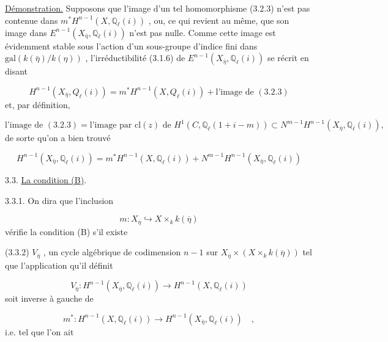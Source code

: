 \underline{Démonstration.} Supposons que l'image d'un tel homomorphisme (3.2.3) n'est pas contenue dans $m^{*}H^{n-1}(X,\mathbb{Q}_{\ell}(i))$ , ou, ce qui revient au même, que son image dans $E^{n-1}(X_{\bar{\eta}},\mathbb{Q}_{\ell}(i))$ n'est pas nulle. Comme cette image est évidemment stable sous l'action d'un sous-groupe d'indice fini dans $\mathrm{gal}(k(\bar{\eta})/k(\eta))$ , l'irréductibilité (3.1.6) de $E^{n-1}(X_{\bar{\eta}},\mathbb{Q}_{\ell}(i))$ se récrit en disant

\begin{equation*}
H^{n-1}(X_{\bar{\eta}},Q_{\ell}(i)) = m^{*}H^{n-1}(X,Q_{\ell}(i)) + \text{l'image de } (3.2.3)
\end{equation*}
et, par définition,

\begin{equation*}
\text{l'image de } (3.2.3) = \text{l'image par } \mathrm{cl}(z) \text{ de } H^{1}(C,\mathbb{Q}_{\ell}(1+i-m)) \subset N^{m-1}H^{n-1}(X_{\bar{\eta}},\mathbb{Q}_{\ell}(i)) ,
\end{equation*}
de sorte qu'on a bien trouvé

\begin{equation*}
H^{n-1}(X_{\bar{\eta}},\mathbb{Q}_{\ell}(i)) = m^{*}H^{n-1}(X,\mathbb{Q}_{\ell}(i)) + N^{m-1}H^{n-1}(X_{\bar{\eta}},\mathbb{Q}_{\ell}(i))
\end{equation*}



3.3. \underline{La condition (B)}.

3.3.1. On dira que l'inclusion

\begin{equation*}
m : X_{\overline{\eta}} \hookrightarrow X \times_{k} k(\overline{\eta})
\end{equation*}
vérifie la condition (B)  s'il existe

(3.3.2) $V_{\overline{\eta}}$ , un cycle algébrique de codimension $n-1$ sur $X_{\overline{\eta}} \times (X \times_{k} k(\overline{\eta}))$ tel que l'application qu'il définit

\begin{equation}\tag{3.3.3}
V_{\overline{\eta}} : H^{n-1}(X_{\overline{\eta}},\mathbb{Q}_{\ell}(i)) \longrightarrow H^{n-1}(X,\mathbb{Q}_{\ell}(i))
\end{equation}
soit inverse à gauche de

\begin{equation}\tag{3.3.4}
m^* : H^{n-1}(X,\mathbb{Q}_{\ell}(i)) \longrightarrow H^{n-1}(X_{\overline{\eta}},\mathbb{Q}_{\ell}(i)) \quad ,
\end{equation}
i.e. tel que l'on ait

